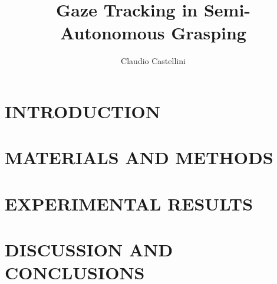 \documentclass[jou, notxfonts]{apa}
\title{Gaze Tracking in Semi-Autonomous Grasping}
\author{Claudio Castellini}
\affiliation{LIRA-Lab, University of Genova, Italy}
\begin{document}
\maketitle

\section{INTRODUCTION}
\label{sec:intro}


\section{MATERIALS AND METHODS}
\label{sec:matmet}


\section{EXPERIMENTAL RESULTS}
\label{sec:res}


\section{DISCUSSION AND CONCLUSIONS}
\label{sec:concl}




\end{document}
